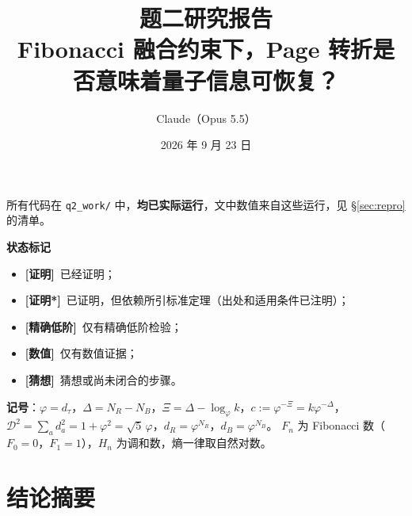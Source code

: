 \documentclass[11pt,a4paper,UTF8]{ctexart}
\title{\textbf{题二研究报告}\\[6pt]
  \large Fibonacci 融合约束下，Page 转折是否意味着量子信息可恢复？}
\author{Claude（Opus 5.5）}
\date{2026 年 9 月 23 日}
\newcommand{\code}[1]{\texttt{#1}}
\newcommand{\tagP}{\texorpdfstring{\textcolor{cP}{\textbf{[证明]}}}{[证明]}}
\newcommand{\tagPs}{\texorpdfstring{\textcolor{cPs}{\textbf{[证明*]}}}{[证明*]}}
\newcommand{\tagE}{\texorpdfstring{\textcolor{cE}{\textbf{[精确低阶]}}}{[精确低阶]}}
\newcommand{\tagN}{\texorpdfstring{\textcolor{cN}{\textbf{[数值]}}}{[数值]}}
\newcommand{\tagC}{\texorpdfstring{\textcolor{cC}{\textbf{[猜想]}}}{[猜想]}}
\begin{document}
\maketitle
\thispagestyle{fancy}

\noindent 所有代码在 \code{q2\_work/} 中，\textbf{均已实际运行}，文中数值来自这些运行，见 \S\ref{sec:repro} 的清单。

\medskip
\noindent\textbf{状态标记}
\begin{itemize}[leftmargin=2em]
  \item \tagP\ 已经证明；
  \item \tagPs\ 已证明，但依赖所引标准定理（出处和适用条件已注明）；
  \item \tagE\ 仅有精确低阶检验；
  \item \tagN\ 仅有数值证据；
  \item \tagC\ 猜想或尚未闭合的步骤。
\end{itemize}

\noindent\textbf{记号}：$\varphi=d_\tau$，$\Delta=N_R-N_B$，$\Xi=\Delta-\log_\varphi k$，$c:=\varphi^{-\Xi}=k\varphi^{-\Delta}$，
$\mathcal D^2=\sum_a d_a^2=1+\varphi^2=\sqrt5\,\varphi$，$d_R=\varphi^{N_R}$，$d_B=\varphi^{N_B}$。
$F_n$ 为 Fibonacci 数（$F_0=0$，$F_1=1$），$H_n$ 为调和数，熵一律取自然对数。

\tableofcontents

\setcounter{section}{-1}
\section{结论摘要}\label{sec:summary}
\end{document}
